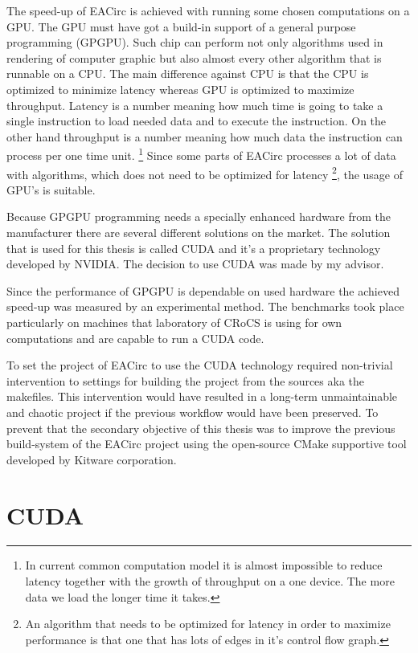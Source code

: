 \documentclass[12pt,oneside]{fithesis2}
\begin{document}
The speed-up of EACirc is achieved with running some chosen computations on a GPU. The GPU must have got a build-in support of a general purpose programming (GPGPU). Such chip can perform not only algorithms used in rendering of computer graphic but also almost every other algorithm that is runnable on a CPU. The main difference against CPU is that the CPU is optimized to minimize latency whereas GPU is optimized to maximize throughput. Latency is a number meaning how much time is going to take a single instruction to load needed data and to execute the instruction. On the other hand throughput is a number meaning how much data the instruction can process per one time unit. \footnote{In current common computation model it is almost impossible to reduce latency together with the growth of throughput on a one device. The more data we load the longer time it takes.} Since some parts of EACirc processes a lot of data with algorithms, which does not need to be optimized for latency \footnote{An algorithm that needs to be optimized for latency in order to maximize performance is that one that has lots of edges in it's control flow graph.}, the usage of GPU's is suitable.

Because GPGPU programming needs a specially enhanced hardware from the manufacturer there are several different solutions on the market. The solution that is used for this thesis is called CUDA \cite{about_cuda} and it's a proprietary technology developed by NVIDIA. \cite{nvidia} The decision to use CUDA was made by my advisor.

Since the performance of GPGPU is dependable on used hardware the achieved speed-up was measured by an experimental method. The benchmarks took place particularly on machines that laboratory of CRoCS is using for own computations and are capable to run a CUDA code.

\medskip

To set the project of EACirc to use the CUDA technology required non-trivial intervention to settings for building the project from the sources aka the makefiles. This intervention would have resulted in a long-term unmaintainable and chaotic project if the previous workflow would have been preserved.  To prevent that the secondary objective of this thesis was to improve the previous build-system of the EACirc project using the open-source CMake \cite{cmake} supportive tool developed by Kitware \cite{kitware} corporation.


\chapter{CUDA}
\end{document}
